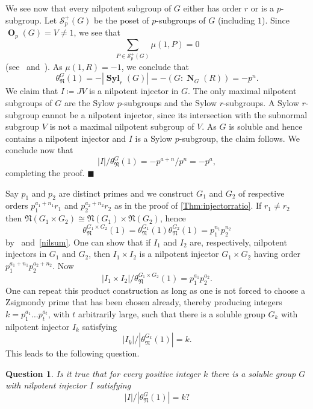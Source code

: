 \documentclass[a4paper,12pt,reqno]{amsart}
\newtheorem{question}{Question}
\numberwithin{equation}{section}
\DeclareMathOperator{\N}{\mathbf{N}}
\DeclareMathOperator{\oh}{\mathbf{O}}
\DeclareMathOperator{\syl}{\mathbf{Syl}}
\newcommand{\card}[1]{\left\lvert{#1}\right\rvert}
\newenvironment{proofofC}{{\bf {Proof of Theorem \ref{Thm:injectorratio}.} }}{\hfill $\blacksquare$ \\}
\def\NN{{\mathfrak N}}
\def\NS{\theta_\NN^G(1)}
\def\SS{{\mathcal S}}
\begin{document}
\begin{proofofC}
We see now that every nilpotent subgroup of $G$ either has order $r$ or is a $p$-subgroup.  
Let $\SS^+_p(G)$ be the poset of $p$-subgroups of $G$ (including $1$).  
Since $\oh_p(G) = V \neq 1$, we see that
\[
\sum_{P \in \SS^+_p(G)}\mu(1,P) = 0
\]
(see~\cite[Prop.~3.8.6]{StanleyEC1} and~\cite[Prop.~2.4]{Quillen}).  
As $\mu(1,R) = -1$, we conclude that
\begin{equation}\label{nilsum}
\NS = - \card{\syl_r(G)} = - (G : \N_G(R)) = -p^n.
\end{equation}
We claim that $I \coloneqq JV$ is a nilpotent injector in $G$.  
The only maximal nilpotent subgroups of $G$ 
are the Sylow $p$-subgroups and the Sylow $r$-subgroups.  
A Sylow $r$-subgroup cannot be a nilpotent injector, 
since its intersection with the subnormal subgroup $V$ 
is not a maximal nilpotent subgroup of $V$.  
As $G$ is soluble and hence contains a nilpotent injector 
and $I$ is a Sylow $p$-subgroup, the claim follows.  
We conclude now that
\[
|I| / \NS = -p^{a+n}/p^n = -p^a,
\]
completing the proof.
\end{proofofC}

Say $p_1$ and $p_2$ are distinct primes and we construct $G_1$ and $G_2$ of respective orders $p_1^{a_1+n_1}r_1$ and $p_2^{a_2+n_2}r_2$ as in the proof of \autoref{Thm:injectorratio}.  
If $r_1 \neq r_2$ then $\NN(G_1 \times G_2) \cong \NN(G_1) \times \NN(G_2)$, hence 
\[
\theta_\NN^{G_1 \times G_2}(1)=\theta_\NN^{G_1}(1) \theta_\NN^{G_2}(1)=p_1^{n_1}p_2^{n_2}
\]
by~\cite[Prop. 3.8.2]{StanleyEC1} and~\eqref{nilsum}.  
One can show that if $I_1$ and $I_2$ are, respectively, nilpotent injectors in $G_1$ and $G_2$, then $I_1 \times I_2$ is a nilpotent injector $G_1 \times G_2$ having order $p_1^{a_1+n_1}p_2^{a_2+n_2}$.  
Now
\[
\card{I_1 \times I_2} / \theta_\NN^{G_1 \times G_2}(1) = p_1^{a_1}p_2^{a_2}.
\]
One can repeat this product construction 
as long as one is not forced to choose a Zsigmondy prime that has been chosen already, 
thereby producing integers $k = p_1^{a_1}\ldots p_t^{a_t}$, with $t$ arbitrarily large, 
such that there is a soluble group $G_k$ with nilpotent injector $I_k$ satisfying
\[
\card{I_k} / \card{\theta_\NN^{G_k}(1)} = k.
\]
This leads to the following question.

\begin{question}
Is it true that for every positive integer $k$ 
there is a soluble group $G$ with nilpotent injector $I$ satisfying
\[
\card{I} / \card{\NS} = k?
\]
\end{question}
\end{document}
